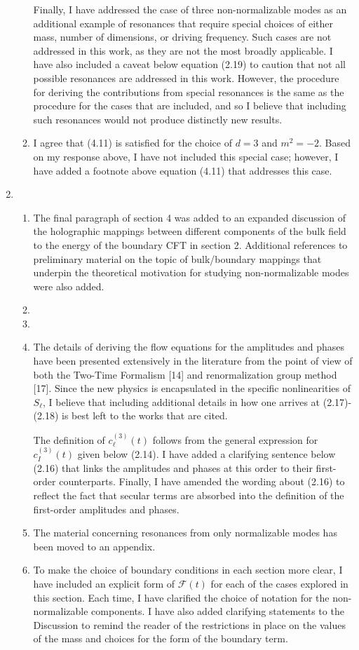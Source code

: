 \documentclass[11pt,letterpaper]{article}
\newcommand{\mc}{\mathcal}
\begin{document}
\begin{enumerate}
\begin{enumerate}
        Finally, I have addressed the case of three non-normalizable modes as an additional example of resonances that require special choices of either mass, number of dimensions, or driving frequency. Such cases are not addressed in this work, as they are not the most broadly applicable. I have also included a caveat below equation (2.19) to caution that not all possible resonances are addressed in this work. However, the procedure for deriving the contributions from special resonances is the same as the procedure for the cases that are included, and so I believe that including such resonances would not produce distinctly new results.
        \item I agree that (4.11) is satisfied for the choice of $d=3$ and $m^2 = -2$. Based on my response above, I have not included this special case; however, I have added a footnote above equation (4.11)  that addresses this case.
    \end{enumerate}
    \item %
    \begin{enumerate}
        \item The final paragraph of section 4 was added to an expanded discussion of the holographic mappings
        between different components of the bulk field to the energy of the boundary CFT in section 2. Additional
        references to preliminary material on the topic of bulk/boundary mappings that underpin the 
        theoretical motivation for studying non-normalizable modes were also added.
        \item 
        \item 
        \item The details of deriving the flow equations for the amplitudes and phases have been presented extensively in the literature from the point of view of both the Two-Time Formalism [14] and renormalization group method [17]. Since the new physics is encapsulated in the specific nonlinearities of $S_\ell$, I believe that including additional details in how one arrives at (2.17)-(2.18) is best left to the works that are cited. 
        
        The definition of $c^{(3)}_\ell (t)$ follows from the general expression for $c_I^{(3)}(t)$ given below (2.14). I have added a clarifying sentence below (2.16) that links the amplitudes and phases at this order to their first-order counterparts.
        Finally, I have amended the wording about (2.16) to reflect the fact that secular terms are absorbed into the definition of the first-order amplitudes and phases. 
        \item The material concerning resonances from only normalizable modes has been moved to an appendix.
        \item To make the choice of boundary conditions in each section more clear, I have included an explicit form of $\mc F(t)$ for each of the cases explored in this section. Each time, I have clarified the choice of notation for the non-normalizable components. I have also added clarifying statements to the Discussion to remind the reader of the restrictions in place on the values of the mass and choices for the form of the boundary term.
        

\end{enumerate}
\end{enumerate}
\end{document}
